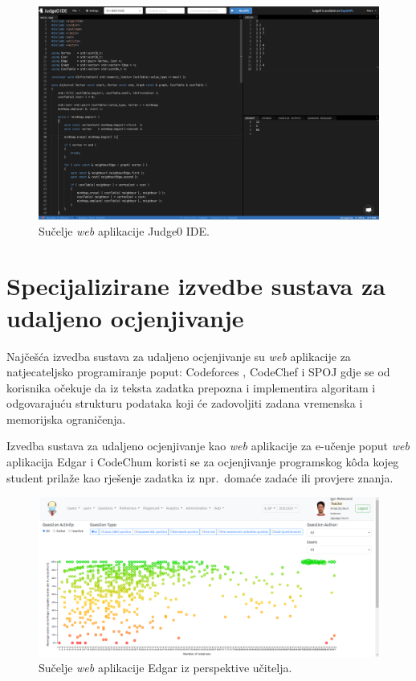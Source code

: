 \documentclass[times, utf8, diplomski]{fer}
\begin{document}
\begin{figure}[htb]
	\centering
	\includegraphics[width=\textwidth]{images/Judge0 IDE UI.png}
	\caption{
		Sučelje \textit{web} aplikacije Judge0 IDE.
	}
	\label{fig:judge0-ide-ui}
\end{figure}

\section{Specijalizirane izvedbe sustava za udaljeno ocjenjivanje}
Najčešća izvedba sustava za udaljeno ocjenjivanje su \textit{web} aplikacije za natjecateljsko programiranje poput: Codeforces \citep{Codeforces}, CodeChef \citep{CodeChef} i SPOJ \citep{SPOJ} gdje se od korisnika očekuje da iz teksta zadatka prepozna i implementira algoritam i odgovarajuću strukturu podataka koji će zadovoljiti zadana vremenska i memorijska ograničenja. 

Izvedba sustava za udaljeno ocjenjivanje kao \textit{web} aplikacije za e-učenje poput \textit{web} aplikacija Edgar \citep{mekterovic2020building} i CodeChum \citep{maranga2019codechum} koristi se za ocjenjivanje  programskog kôda kojeg student prilaže kao rješenje zadatka iz npr.\ domaće zadaće ili provjere znanja.

\begin{figure}[htb]
	\centering
	\includegraphics[width=\textwidth]{images/Edgar UI.png}
	\caption{
		Sučelje \textit{web} aplikacije Edgar iz perspektive učitelja.
	}
	\label{fig:edgar-ui}
\end{figure}
\end{document}
